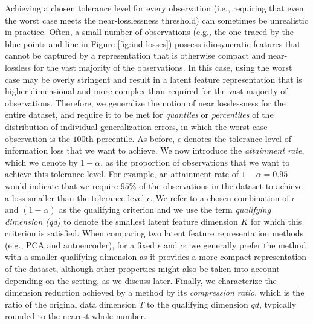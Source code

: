 Achieving a chosen tolerance level for every observation (i.e., requiring that even the worst case meets the near-losslessness threshold) can sometimes be unrealistic in practice.
Often, a small number of observations (e.g., the one traced by the blue points and line in Figure \ref{fig:ind-losses}) possess idiosyncratic features that cannot be captured by a representation that is otherwise compact and near-lossless for the vast majority of the observations.
In this case, using the worst case may be overly stringent and result in a latent feature representation that is higher-dimensional and more complex than required for the vast majority of observations.
Therefore, we generalize the notion of near losslessness for the entire dataset, and require it to be met for \emph{quantiles} or \emph{percentiles} of the distribution of individual generalization errors, in which the worst-case observation is the $100$th percentile. 
As before, $\epsilon$ denotes the tolerance level of information loss that we want to achieve.
We now introduce the \emph{attainment rate}, which we denote by $1 - \alpha$, as the proportion of observations that we want to achieve this tolerance level.
For example, an attainment rate of $1 - \alpha = 0.95$ would indicate that we require $95\%$ of the observations in the dataset to achieve a loss smaller than the tolerance level $\epsilon$.
We refer to a chosen combination of $\epsilon$ and $(1 - \alpha)$ as the qualifying criterion and we use the term \emph{qualifying dimension (qd)} to denote the smallest latent feature dimension $K$ for which this criterion is satisfied.
When comparing two latent feature representation methods (e.g., PCA and autoencoder), for a fixed $\epsilon$ and $\alpha$, we generally prefer the method with a smaller qualifying dimension as it provides a more compact representation of the dataset, although other properties might also be taken into account depending on the setting, as we discuss later.
Finally, we characterize the dimension reduction achieved by a method by its \emph{compression ratio}, which is the ratio of the original data dimension $T$ to the qualifying dimension $qd$, typically rounded to the nearest whole number.


